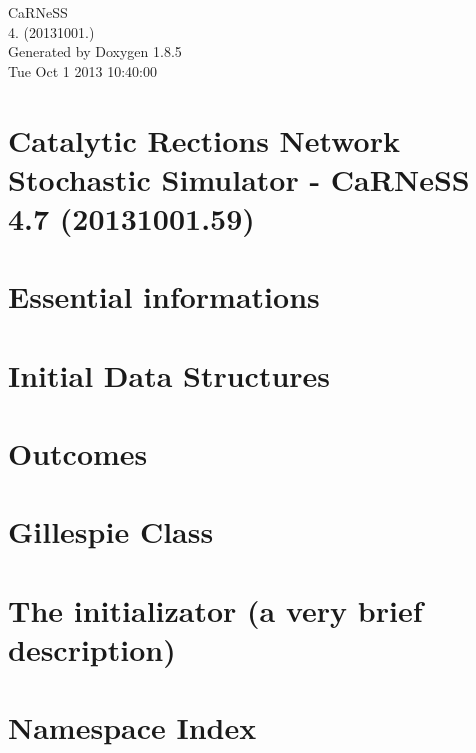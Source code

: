 \documentclass[twoside]{book}
\newcommand{\clearemptydoublepage}{%
  \newpage{\pagestyle{empty}\cleardoublepage}%
}
\begin{document}
\hypersetup{pageanchor=false}
\begin{titlepage}
\vspace*{7cm}
\begin{center}%
{\Large Ca\-R\-Ne\-S\-S \\[1ex]\large 4. (20131001.) }\\
\vspace*{1cm}
{\large Generated by Doxygen 1.8.5}\\
\vspace*{0.5cm}
{\small Tue Oct 1 2013 10:40:00}\\
\end{center}
\end{titlepage}
\clearemptydoublepage
\tableofcontents
\clearemptydoublepage
{}
\hypersetup{pageanchor=true}

\chapter{Catalytic Rections Network Stochastic Simulator -\/ Ca\-R\-Ne\-S\-S 4.7 (20131001.59)}
\label{index}\hypertarget{index}{}
\chapter{Essential informations}
\label{intro}
\hypertarget{intro}{}

\chapter{Initial Data Structures}
\label{page_init_str}
\hypertarget{page_init_str}{}

\chapter{Outcomes}
\label{pageoutcomes}
\hypertarget{pageoutcomes}{}

\chapter{Gillespie Class}
\label{page_gillespie}
\hypertarget{page_gillespie}{}

\chapter{The initializator (a very brief description)}
\label{page_initializator}
\hypertarget{page_initializator}{}

\chapter{Namespace Index}

\end{document}
